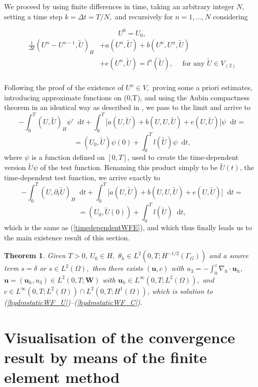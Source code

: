 \documentclass[12pt]{report}
\newtheorem{theorem}{Theorem}
\numberwithin{theorem}{chapter}
\numberwithin{corollary}{chapter}
\numberwithin{lemma}{chapter}
\numberwithin{remark}{chapter}
\numberwithin{definition}{chapter}
\numberwithin{prop}{chapter}
\newcommand*\diff{\mathop{}\!\mathrm{d}}
\begin{document}
We proceed by using finite differences in time, taking an arbitrary integer $N,$ setting a time step $k = \Delta t = T/N,$ and recursively for $n = 1, ... , N$ considering

\[ U^0 = U_0,\]
\begin{equation}
  \begin{split}
    \frac{1}{\Delta t} (U^n - U^{n-1}, \tilde{U})_H & +  a(U^n, \tilde{U}) + b(U^n,U^n, \tilde{U})\\
    & + e(U^n, \tilde{U}) = l^n(\tilde{U}), \quad \text{ for any } \tilde{U} \in V_{(2)} \\
  \end{split}
\end{equation}

Following the proof of the existence of $U^n \in V,$ proving some a priori estimates, introducing approximate functions on (0,T), and using the Aubin compactness theorem in an identical way as described in \cite{temam2005some}, we pass to the limit and arrive to
%
\[ - \int_0^T (U, \tilde{U})_H \psi ' \diff t + \int_0^T \big [ a(U, \tilde{U}) + b(U,U, \tilde{U}) + e(U, \tilde{U}) \big ] \psi \diff t = \]
\[ = (U_0, \tilde{U}) \psi (0) + \int_0 ^ T l(\tilde{U}) \psi \diff t, \]
%
where $\psi$ is a function defined on $[0,T]$, used to create the time-dependent version $\tilde{U}\psi$ of the test function. Renaming this product simply to be $\tilde{U}(t)$, the time-dependent test function, we arrive exactly to
%
\[ - \int_0^T (U, \partial_t \tilde{U})_H \diff t + \int_0^T \big [ a(U, \tilde{U}) + b(U,U, \tilde{U}) + e(U, \tilde{U}) \big ] \diff t = \]
\[ = (U_0, \tilde{U}(0)) + \int_0 ^ T l(\tilde{U}) \diff t, \]
%
which is the same as (\ref{timedependentWFE}), and which thus finally leads us to the main existence result of this section.

\begin{theorem}

Given $T > 0$, $U_0 \in H,$ $\theta_h \in L^2(0,T; H^{-1/2}(\Gamma_G))$ and a source term $s = \delta$ or $s \in L^2(\Omega),$ then there exists $(\mathbf{u}, c)$ with $u_3 = - \int_0^z \nabla_h \cdot \mathbf{u}_h$, $\mathbf{u} = (\mathbf{u}_h, u_3) \in L^2 (0, T; \mathbf{W})$ with $\mathbf{u}_h \in L^\infty (0,T; L^2(\Omega)),$ and $c \in L^\infty (0,T; L^2 (\Omega)) \cap L^2( 0,T; H^1(\Omega))$, which is solution to (\ref{hydrostaticWF_U})--(\ref{hydrostaticWF_C}).

\end{theorem}

\section{Visualisation of the convergence result by means of the finite element method}\label{visualizationFEM}
\end{document}
